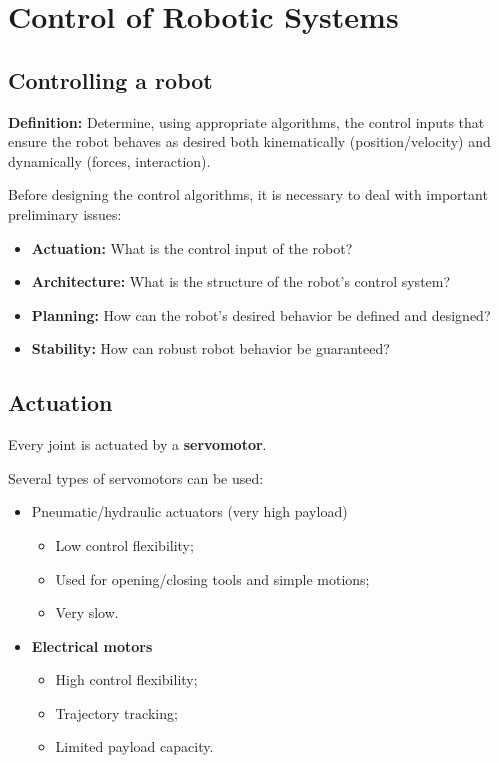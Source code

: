 \section{Control of Robotic Systems}

\subsection{Controlling a robot}

\textbf{Definition:} Determine, using appropriate algorithms, the control inputs that ensure the robot behaves as desired both kinematically (position/velocity) and dynamically (forces, interaction).

Before designing the control algorithms, it is necessary to deal with important preliminary issues:

\begin{itemize}
    \item \textbf{Actuation:} What is the control input of the robot?
    \item \textbf{Architecture:} What is the structure of the robot's control system?
    \item \textbf{Planning:} How can the robot's desired behavior be defined and designed?
    \item \textbf{Stability:} How can robust robot behavior be guaranteed?
\end{itemize}

\hfill

\subsection{Actuation}

Every joint is actuated by a \textbf{servomotor}.
    
Several types of servomotors can be used:

\begin{itemize}
    \item Pneumatic/hydraulic actuators (very high payload)
    \begin{itemize}
        \item Low control flexibility;
        \item Used for opening/closing tools and simple motions;
        \item Very slow.
    \end{itemize}
    \item \textbf{Electrical motors}
    \begin{itemize}
        \item High control flexibility;
        \item Trajectory tracking;
        \item Limited payload capacity.
    \end{itemize}
\end{itemize}
    
